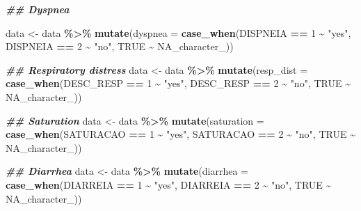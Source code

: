 \documentclass[
]{article}
\newenvironment{Shaded}{\begin{snugshade}}{\end{snugshade}}
\newcommand{\AttributeTok}[1]{\textcolor[rgb]{0.13,0.29,0.53}{#1}}
\newcommand{\ConstantTok}[1]{\textcolor[rgb]{0.56,0.35,0.01}{#1}}
\newcommand{\DecValTok}[1]{\textcolor[rgb]{0.00,0.00,0.81}{#1}}
\newcommand{\DocumentationTok}[1]{\textcolor[rgb]{0.56,0.35,0.01}{\textbf{\textit{#1}}}}
\newcommand{\FunctionTok}[1]{\textcolor[rgb]{0.13,0.29,0.53}{\textbf{#1}}}
\newcommand{\NormalTok}[1]{#1}
\newcommand{\OtherTok}[1]{\textcolor[rgb]{0.56,0.35,0.01}{#1}}
\newcommand{\SpecialCharTok}[1]{\textcolor[rgb]{0.81,0.36,0.00}{\textbf{#1}}}
\newcommand{\StringTok}[1]{\textcolor[rgb]{0.31,0.60,0.02}{#1}}
\begin{document}
\begin{Shaded}
\begin{Highlighting}[]
\DocumentationTok{\#\# Dyspnea}

\NormalTok{data }\OtherTok{\textless{}{-}}\NormalTok{  data }\SpecialCharTok{\%\textgreater{}\%}
  \FunctionTok{mutate}\NormalTok{(}\AttributeTok{dyspnea =} \FunctionTok{case\_when}\NormalTok{(DISPNEIA }\SpecialCharTok{==} \DecValTok{1} \SpecialCharTok{\textasciitilde{}} \StringTok{"yes"}\NormalTok{,}
\NormalTok{                              DISPNEIA }\SpecialCharTok{==} \DecValTok{2} \SpecialCharTok{\textasciitilde{}} \StringTok{"no"}\NormalTok{,}
                              \ConstantTok{TRUE} \SpecialCharTok{\textasciitilde{}} \ConstantTok{NA\_character\_}\NormalTok{))}

\DocumentationTok{\#\# Respiratory distress}
\NormalTok{data }\OtherTok{\textless{}{-}}\NormalTok{  data }\SpecialCharTok{\%\textgreater{}\%}
  \FunctionTok{mutate}\NormalTok{(}\AttributeTok{resp\_dist =} \FunctionTok{case\_when}\NormalTok{(DESC\_RESP }\SpecialCharTok{==} \DecValTok{1} \SpecialCharTok{\textasciitilde{}} \StringTok{"yes"}\NormalTok{,}
\NormalTok{                              DESC\_RESP }\SpecialCharTok{==} \DecValTok{2} \SpecialCharTok{\textasciitilde{}} \StringTok{"no"}\NormalTok{,}
                              \ConstantTok{TRUE} \SpecialCharTok{\textasciitilde{}} \ConstantTok{NA\_character\_}\NormalTok{))}

\DocumentationTok{\#\# Saturation}
\NormalTok{data }\OtherTok{\textless{}{-}}\NormalTok{  data }\SpecialCharTok{\%\textgreater{}\%}
  \FunctionTok{mutate}\NormalTok{(}\AttributeTok{saturation =} \FunctionTok{case\_when}\NormalTok{(SATURACAO }\SpecialCharTok{==} \DecValTok{1} \SpecialCharTok{\textasciitilde{}} \StringTok{"yes"}\NormalTok{,}
\NormalTok{                              SATURACAO }\SpecialCharTok{==} \DecValTok{2} \SpecialCharTok{\textasciitilde{}} \StringTok{"no"}\NormalTok{,}
                              \ConstantTok{TRUE} \SpecialCharTok{\textasciitilde{}} \ConstantTok{NA\_character\_}\NormalTok{))}

\DocumentationTok{\#\# Diarrhea}
\NormalTok{data }\OtherTok{\textless{}{-}}\NormalTok{  data }\SpecialCharTok{\%\textgreater{}\%}
  \FunctionTok{mutate}\NormalTok{(}\AttributeTok{diarrhea =} \FunctionTok{case\_when}\NormalTok{(DIARREIA }\SpecialCharTok{==} \DecValTok{1} \SpecialCharTok{\textasciitilde{}} \StringTok{"yes"}\NormalTok{,}
\NormalTok{                              DIARREIA }\SpecialCharTok{==} \DecValTok{2} \SpecialCharTok{\textasciitilde{}} \StringTok{"no"}\NormalTok{,}
                              \ConstantTok{TRUE} \SpecialCharTok{\textasciitilde{}} \ConstantTok{NA\_character\_}\NormalTok{))}


\end{Highlighting}
\end{Shaded}
\end{document}
